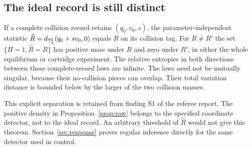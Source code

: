 \subsection{The ideal record is still distinct}
If a complete collision record retains $(q_0,v_0,s)$, the
parameter-independent statistic
$\widehat R=d_{\mathbb T_\Lambda^2}(q_0+sv_0,0)$ equals $R$ on its collision tag.
For $R\ne R'$ the set $\{H=1,\widehat R=R\}$ has positive mass under $R$
and zero under $R'$, in either the whole equilibrium or cartridge experiment.
The relative entropies in both directions between these complete-record
laws are infinite. The laws need not be mutually singular, because their
no-collision pieces can overlap. Their total variation distance is bounded
below by the larger of the two collision masses.

This explicit separation is retained from finding S1 of the referee report.
The positive density in Proposition~\ref{prop:raw} belongs to the specified
coordinate detector, not to the ideal record. An arbitrary threshold of
$\widehat R$ would not give this theorem. Section~\ref{sec:response} proves
regular inference directly for the same detector used in control.
